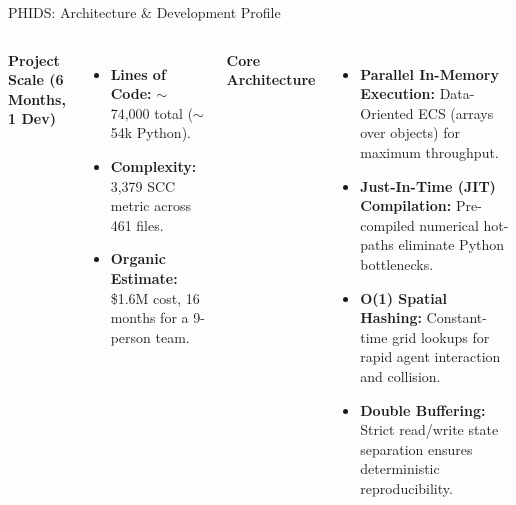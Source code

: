 \documentclass[aspectratio=169]{beamer}
\begin{document}
\begin{frame}{PHIDS: Architecture \& Development Profile}
    \begin{columns}[T, onlytextwidth]
        \textbf{Project Scale (6 Months, 1 Dev)}
        \begin{itemize}\footnotesize
            \item \textbf{Lines of Code:} $\sim$74,000 total ($\sim$54k Python).
            \item \textbf{Complexity:} 3,379 SCC metric across 461 files.
            \item \textbf{Organic Estimate:} \$1.6M cost, 16 months for a 9-person team.
        \end{itemize}
        \vspace{0.2cm}
        \textbf{Core Architecture}
        \begin{itemize}\footnotesize
            \item \textbf{Parallel In-Memory Execution:} Data-Oriented ECS (arrays over objects) for maximum throughput.
            \item \textbf{Just-In-Time (JIT) Compilation:} Pre-compiled numerical hot-paths eliminate Python bottlenecks.
            \item \textbf{O(1) Spatial Hashing:} Constant-time grid lookups for rapid agent interaction and collision.
            \item \textbf{Double Buffering:} Strict read/write state separation ensures deterministic reproducibility.
        \end{itemize}


\end{columns}
\end{frame}
\end{document}

